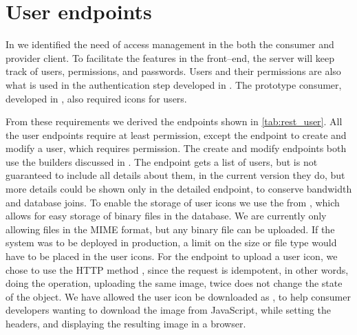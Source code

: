 \section{User endpoints}

In  we identified the need of access management in the
both the consumer and provider client. To facilitate the features in the
front--end, the server will keep track of users, permissions, and passwords.
Users and their permissions are also what is used in the authentication step
developed in . The prototype consumer, developed in
, also required icons for users.


From these requirements we derived the endpoints shown in \cref{tab:rest_user}.
All the user endpoints require at least  permission, except the
endpoint to create and modify a user, which requires 
permission. The create and modify endpoints both use the builders discussed in
. The  endpoint gets a list of users,
but is not guaranteed to include all details about them, in the current version
they do, but more details could be shown only in the detailed 
endpoint, to conserve bandwidth and database joins. To enable the storage of
user icons we use the  from ,
which allows for easy storage of binary files in the database. We are currently
only allowing files in the  \ac{MIME} format, but any binary
file can be uploaded.  If the system was to be deployed in production, a limit
on the size or file type would have to be placed in the user icons. For the
endpoint to upload a user icon, we chose to use the HTTP method ,
since the request is idempotent, in other words, doing the operation, uploading
the same image, twice does not change the state of the object. We have allowed
the user icon be downloaded as , to help consumer developers
wanting to download the image from JavaScript, while setting the headers, and
displaying the resulting image in a browser.

